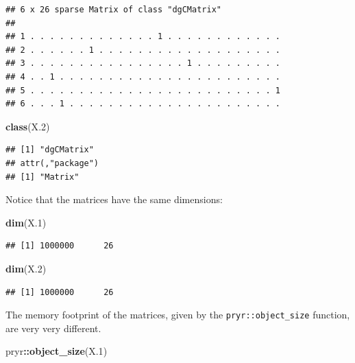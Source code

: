 \documentclass[]{book}
\newenvironment{Shaded}{\begin{snugshade}}{\end{snugshade}}
\newcommand{\FloatTok}[1]{\textcolor[rgb]{0.00,0.00,0.81}{#1}}
\newcommand{\KeywordTok}[1]{\textcolor[rgb]{0.13,0.29,0.53}{\textbf{#1}}}
\newcommand{\NormalTok}[1]{#1}
\newcommand{\OperatorTok}[1]{\textcolor[rgb]{0.81,0.36,0.00}{\textbf{#1}}}
\theoremstyle{definition}
\theoremstyle{definition}
\theoremstyle{definition}
\theoremstyle{remark}
\begin{document}
\begin{verbatim}
## 6 x 26 sparse Matrix of class "dgCMatrix"
##                                                      
## 1 . . . . . . . . . . . . . 1 . . . . . . . . . . . .
## 2 . . . . . . 1 . . . . . . . . . . . . . . . . . . .
## 3 . . . . . . . . . . . . . . . . 1 . . . . . . . . .
## 4 . . 1 . . . . . . . . . . . . . . . . . . . . . . .
## 5 . . . . . . . . . . . . . . . . . . . . . . . . . 1
## 6 . . . 1 . . . . . . . . . . . . . . . . . . . . . .
\end{verbatim}

\begin{Shaded}
\begin{Highlighting}[]
\KeywordTok{class}\NormalTok{(X}\FloatTok{.2}\NormalTok{)}
\end{Highlighting}
\end{Shaded}

\begin{verbatim}
## [1] "dgCMatrix"
## attr(,"package")
## [1] "Matrix"
\end{verbatim}

Notice that the matrices have the same dimensions:

\begin{Shaded}
\begin{Highlighting}[]
\KeywordTok{dim}\NormalTok{(X}\FloatTok{.1}\NormalTok{)}
\end{Highlighting}
\end{Shaded}

\begin{verbatim}
## [1] 1000000      26
\end{verbatim}

\begin{Shaded}
\begin{Highlighting}[]
\KeywordTok{dim}\NormalTok{(X}\FloatTok{.2}\NormalTok{)}
\end{Highlighting}
\end{Shaded}

\begin{verbatim}
## [1] 1000000      26
\end{verbatim}

The memory footprint of the matrices, given by the \texttt{pryr::object\_size} function, are very very different.

\begin{Shaded}
\begin{Highlighting}[]
\NormalTok{pryr}\OperatorTok{::}\KeywordTok{object_size}\NormalTok{(X}\FloatTok{.1}\NormalTok{)}
\end{Highlighting}
\end{Shaded}
\end{document}
